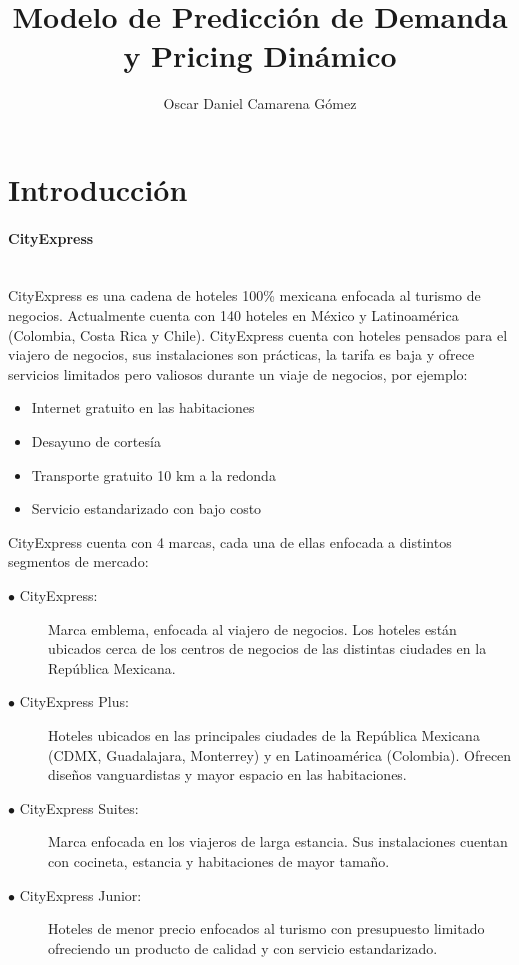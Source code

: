 \documentclass[a4paper,11pt]{article}
\title{\Huge Modelo de Predicción de Demanda y Pricing Dinámico}
\author{Oscar Daniel Camarena Gómez}
\date{}
\begin{document}
\maketitle
{}
\newpage
{}
\section{Introducción}
\paragraph {CityExpress} ~ \\
CityExpress es una cadena de hoteles 100\% mexicana enfocada al turismo de negocios. Actualmente cuenta con 140 hoteles en México y Latinoamérica (Colombia, Costa Rica y Chile). CityExpress cuenta con hoteles pensados para el viajero de negocios, sus instalaciones son prácticas, la tarifa es baja y ofrece servicios limitados pero valiosos durante un viaje de negocios, por ejemplo:
\begin{itemize}[noitemsep]
\item Internet gratuito en las habitaciones
\item Desayuno de cortesía
\item Transporte gratuito 10 km a la redonda
\item Servicio estandarizado con bajo costo
\end{itemize}
CityExpress cuenta con 4 marcas, cada una de ellas enfocada a distintos segmentos de mercado:
\begin{description}
\item [$\bullet$ CityExpress:] Marca emblema, enfocada al viajero de negocios. Los hoteles están ubicados cerca de los centros de negocios de las distintas ciudades en la República Mexicana.
\item [$\bullet$ CityExpress Plus:] Hoteles ubicados en las principales ciudades de la República Mexicana (CDMX, Guadalajara, Monterrey) y en Latinoamérica (Colombia). Ofrecen diseños vanguardistas y mayor espacio en las habitaciones.
\item [$\bullet$ CityExpress Suites:] Marca enfocada en los viajeros de larga estancia. Sus instalaciones cuentan con cocineta, estancia y habitaciones de mayor tamaño.
\item [$\bullet$ CityExpress Junior:] Hoteles de menor precio enfocados al turismo con presupuesto limitado ofreciendo un producto de calidad y con servicio estandarizado.
\end{description}
\end{document}

